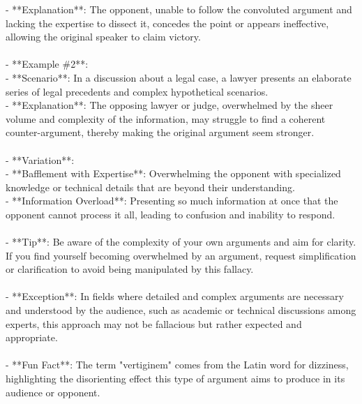 \documentclass[a4paper,12pt,single,pdftex]{scrartcl}
\begin{document}
{    
        - **Explanation**: The opponent, unable to follow the convoluted argument and lacking the expertise to dissect it, concedes the point or appears ineffective, allowing the original speaker to claim victory.
    \\

    
      
    \\

    
      - **Example \#2**:
    \\

    
        - **Scenario**: In a discussion about a legal case, a lawyer presents an elaborate series of legal precedents and complex hypothetical scenarios.
    \\

    
        - **Explanation**: The opposing lawyer or judge, overwhelmed by the sheer volume and complexity of the information, may struggle to find a coherent counter-argument, thereby making the original argument seem stronger.
    \\

    
      
    \\

    
      - **Variation**:
    \\

    
        - **Bafflement with Expertise**: Overwhelming the opponent with specialized knowledge or technical details that are beyond their understanding.
    \\

    
        - **Information Overload**: Presenting so much information at once that the opponent cannot process it all, leading to confusion and inability to respond.
    \\

    
      
    \\

    
      - **Tip**: Be aware of the complexity of your own arguments and aim for clarity. If you find yourself becoming overwhelmed by an argument, request simplification or clarification to avoid being manipulated by this fallacy.
    \\

    
      
    \\

    
      - **Exception**: In fields where detailed and complex arguments are necessary and understood by the audience, such as academic or technical discussions among experts, this approach may not be fallacious but rather expected and appropriate.
    \\

    
      
    \\

    
      - **Fun Fact**: The term "vertiginem" comes from the Latin word for dizziness, highlighting the disorienting effect this type of argument aims to produce in its audience or opponent.
    \\

  }
\end{document}

